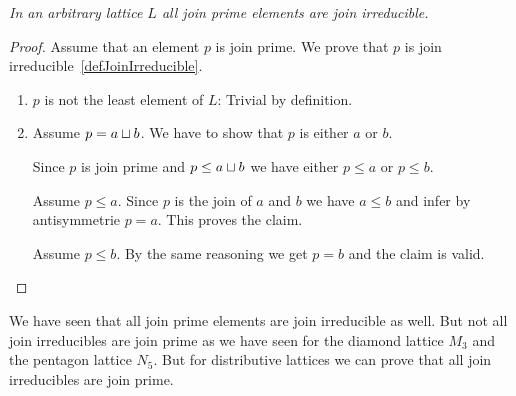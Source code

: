 \begin{theorem}
    \emph{In an arbitrary lattice $L$ all join prime elements are join
    irreducible.}

    \begin{proof}
        Assume that an element $p$ is join prime. We prove that $p$ is join
        irreducible~\ref{defJoinIrreducible}.

        \begin{enumerate}
            \item $p$ is not the least element of $L$: Trivial by definition.

            \item Assume $p = a \sqcup b$. We have to show that $p$ is either $a$
                or $b$.

                Since $p$ is join prime and $p \le a \sqcup b$ we have either $p
                \le a$ or $p \le b$.

                Assume $p \le a$. Since $p$ is the join of $a$ and $b$ we have
                $a \le b$ and infer by antisymmetrie $p = a$. This proves the
                claim.

                Assume $p \le b$. By the same reasoning we get $p = b$ and the
                claim is valid.
        \end{enumerate}
    \end{proof}
\end{theorem}


We have seen that all join prime elements are join irreducible as well. But not
all join irreducibles are join prime as we have seen for the diamond lattice
$M_3$ and the pentagon lattice $N_5$. But for distributive lattices we can prove
that all join irreducibles are join prime.


